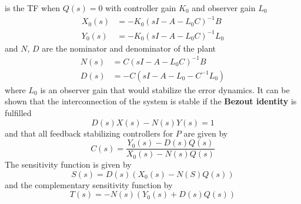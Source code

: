is the TF when $Q(s)=0$ with controller gain $K_0$ and observer gain $L_0$
\noindent\begin{align*}
    X_0(s) & = -K_0{(sI-A-L_0C)}^{-1}B   \\
    Y_0(s) & = -K_0{(sI-A-L_0C)}^{-1}L_0
\end{align*}
and $N$, $D$ are the nominator and denominator of the plant
\begin{align*}
    N(s) & =C{(sI-A-L_0C)}^{-1}B    \\
    D(s) & = -C(sI-A-L_0-C^{-1}L_0)
\end{align*}
where $L_0$ is an observer gain that would stabilize the error dynamics.
\newpar{}
It can be shown that the interconnection of the system is stable if the \textbf{Bezout identity} is fulfilled
\begin{equation*}
    D(s)X(s)-N(s)Y(s)=1
\end{equation*}
and that all feedback stabilizing controllers for $P$ are given by
\begin{equation*}
    C(s) = \frac{Y_0(s) -D(s)Q(s)}{X_0(s)-N(s)Q(s)}
\end{equation*}
The sensitivity function is given by
\begin{equation*}
    S(s) = D(s)(X_0(s)-N(S)Q(s))
\end{equation*}
and the complementary sensitivity function by
\begin{equation*}
    T(s) = -N(s)(Y_0(s)+D(s)Q(s))
\end{equation*}